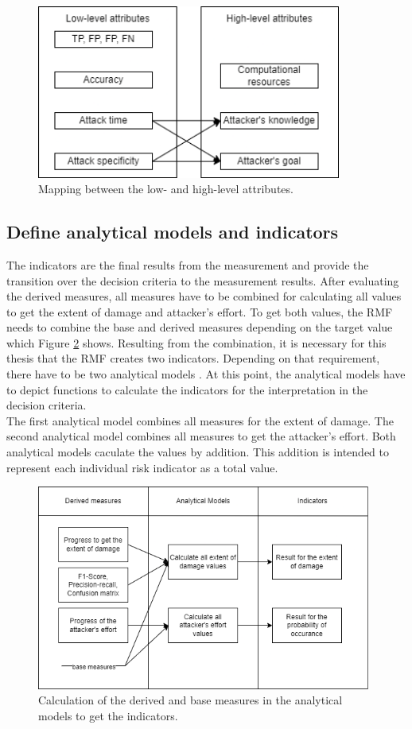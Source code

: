 \begin{figure}[ht!]
  \centering
  \includegraphics[width=10cm]{pictures/attribute_mapping.png}
  \caption{Mapping between the low- and high-level attributes.}
  \label{fig:attribute_mapping}
\end{figure}

\subsection{Define analytical models and indicators}

The indicators are the final results from the measurement and provide the transition over the decision criteria to the measurement results. After evaluating the derived measures, all measures have to be combined for calculating all values to get the extent of damage and attacker's effort. To get both values, the RMF needs to combine the base and derived measures depending on the target value which Figure \ref{fig:indicators} shows. Resulting from the combination, it is necessary for this thesis that the RMF creates two indicators. Depending on that requirement, there have to be two analytical models \cite{ISO_27004_2009}. At this point, the analytical models have to depict functions to calculate the indicators for the interpretation in the decision criteria. \\ The first analytical model combines all measures for the extent of damage. The second analytical model combines all measures to get the attacker's effort. Both analytical models caculate the values by addition. This addition is intended to represent each individual risk indicator as a total value.

\begin{figure}[ht!]
  \centering
  \includegraphics[width=11cm]{pictures/indicators.png}
  \caption{Calculation of the derived and base measures in the analytical models to get the indicators.}
  \label{fig:indicators}
\end{figure}

